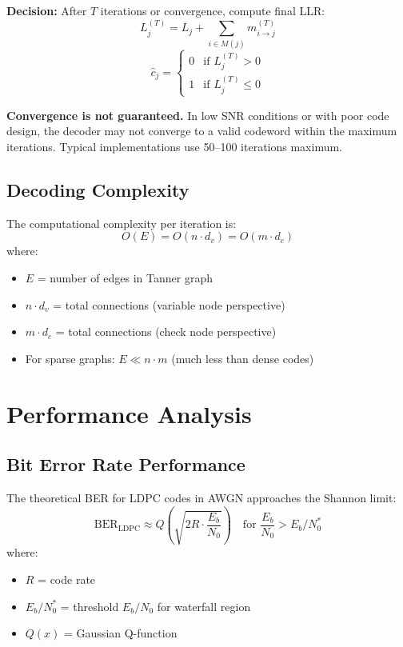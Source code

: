 \textbf{Decision:} After $T$ iterations or convergence, compute final LLR:
\begin{equation}
L_j^{(T)} = L_j + \sum_{i \in M(j)} m_{i \rightarrow j}^{(T)}
\end{equation}
\begin{equation}
\hat{c}_j = \begin{cases}
0 & \text{if } L_j^{(T)} > 0 \\
1 & \text{if } L_j^{(T)} \leq 0
\end{cases}
\end{equation}

\begin{warningbox}
\textbf{Convergence is not guaranteed.} In low SNR conditions or with poor code design, the decoder may not converge to a valid codeword within the maximum iterations. Typical implementations use 50--100 iterations maximum.
\end{warningbox}

\subsection{Decoding Complexity}

The computational complexity per iteration is:
\begin{equation}
O(E) = O(n \cdot d_v) = O(m \cdot d_c)
\end{equation}
where:
\begin{itemize}
\item $E$ = number of edges in Tanner graph
\item $n \cdot d_v$ = total connections (variable node perspective)
\item $m \cdot d_c$ = total connections (check node perspective)
\item For sparse graphs: $E \ll n \cdot m$ (much less than dense codes)
\end{itemize}

\section{Performance Analysis}

\subsection{Bit Error Rate Performance}

The theoretical BER for LDPC codes in AWGN approaches the Shannon limit:
\begin{equation}
\mathrm{BER}_{\mathrm{LDPC}} \approx Q\left(\sqrt{2R \cdot \frac{E_b}{N_0}}\right) \quad \text{for } \frac{E_b}{N_0} > E_b/N_0^*
\end{equation}
where:
\begin{itemize}
\item $R$ = code rate
\item $E_b/N_0^*$ = threshold $E_b/N_0$ for waterfall region
\item $Q(x)$ = Gaussian Q-function
\end{itemize}

